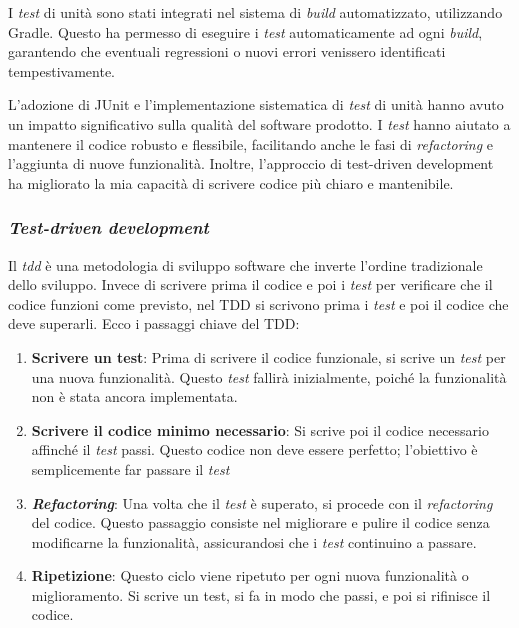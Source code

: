 I \textit{test} di unità sono stati integrati nel sistema di \textit{build} automatizzato, utilizzando Gradle. 
Questo ha permesso di eseguire i \textit{test} automaticamente ad ogni \textit{build}, 
garantendo che eventuali regressioni o nuovi errori venissero identificati tempestivamente.

L'adozione di JUnit e l'implementazione sistematica di \textit{test} di unità hanno avuto un impatto significativo sulla qualità del software prodotto. 
I \textit{test} hanno aiutato a mantenere il codice robusto e flessibile, facilitando anche le fasi di \textit{refactoring} e l'aggiunta di nuove funzionalità. 
Inoltre, l'approccio di test-driven development ha migliorato la mia capacità di scrivere codice più chiaro e mantenibile.

\subsubsection{\textit{Test-driven development}}
Il \textit{\gls{tdd}} è una metodologia di sviluppo software che inverte l'ordine tradizionale dello sviluppo. 
Invece di scrivere prima il codice e poi i \textit{test} per verificare che il codice funzioni come previsto, nel TDD si scrivono prima 
i \textit{test} e poi il codice che deve superarli. Ecco i passaggi chiave del TDD:
\begin{enumerate}
  \item \textbf{Scrivere un test}: Prima di scrivere il codice funzionale, si scrive un \textit{test} per una nuova funzionalità. Questo \textit{test} fallirà inizialmente, poiché la funzionalità non è stata ancora implementata.
  \item \textbf{Scrivere il codice minimo necessario}: Si scrive poi il codice necessario affinché il \textit{test} passi. Questo codice non deve essere perfetto; l'obiettivo è semplicemente far passare il \textit{test} 
  \item \textit{\textbf{Refactoring}}: Una volta che il \textit{test} è superato, si procede con il \textit{refactoring} del codice. Questo passaggio consiste nel migliorare e pulire il codice senza modificarne la funzionalità, assicurandosi che i \textit{test} continuino a passare.
  \item \textbf{Ripetizione}: Questo ciclo viene ripetuto per ogni nuova funzionalità o miglioramento. Si scrive un test, si fa in modo che passi, e poi si rifinisce il codice.
\end{enumerate}

